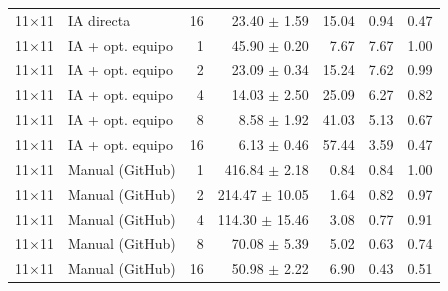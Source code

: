 \begin{tabular}{llrrrrr}
11$\times$11 & IA directa & 16 & 23.40 $\pm$ 1.59 & 15.04 & 0.94 & 0.47 \\
11$\times$11 & IA + opt. equipo & 1 & 45.90 $\pm$ 0.20 & 7.67 & 7.67 & 1.00 \\
11$\times$11 & IA + opt. equipo & 2 & 23.09 $\pm$ 0.34 & 15.24 & 7.62 & 0.99 \\
11$\times$11 & IA + opt. equipo & 4 & 14.03 $\pm$ 2.50 & 25.09 & 6.27 & 0.82 \\
11$\times$11 & IA + opt. equipo & 8 & 8.58 $\pm$ 1.92 & 41.03 & 5.13 & 0.67 \\
11$\times$11 & IA + opt. equipo & 16 & 6.13 $\pm$ 0.46 & 57.44 & 3.59 & 0.47 \\
11$\times$11 & Manual (GitHub) & 1 & 416.84 $\pm$ 2.18 & 0.84 & 0.84 & 1.00 \\
11$\times$11 & Manual (GitHub) & 2 & 214.47 $\pm$ 10.05 & 1.64 & 0.82 & 0.97 \\
11$\times$11 & Manual (GitHub) & 4 & 114.30 $\pm$ 15.46 & 3.08 & 0.77 & 0.91 \\
11$\times$11 & Manual (GitHub) & 8 & 70.08 $\pm$ 5.39 & 5.02 & 0.63 & 0.74 \\
11$\times$11 & Manual (GitHub) & 16 & 50.98 $\pm$ 2.22 & 6.90 & 0.43 & 0.51 \\
\bottomrule
\end{tabular}
